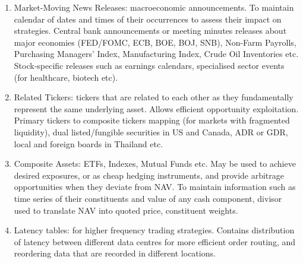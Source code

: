 \begin{definition}
\begin{enumerate}[label=\roman*.]
\item Market-Moving News Releases: macroeconomic announcements. To maintain calendar of dates and times of their occurrences to assess their impact on strategies. Central bank announcements or meeting minutes releases about major economies (FED/FOMC, ECB, BOE, BOJ, SNB), Non-Farm Payrolls, Purchasing Managers' Index, Manufacturing Index, Crude Oil Inventories etc.\\
Stock-specific releases such as earnings calendars, specialised sector events (for healthcare, biotech etc).
\item Related Tickers: tickers that are related to each other as they fundamentally represent the same underlying asset. Allows efficient opportunity exploitation. Primary tickers to composite tickers mapping (for markets with fragmented liquidity), dual listed/fungible securities in US and Canada, ADR or GDR, local and foreign boards in Thailand etc.
\item Composite Assets: ETFs, Indexes, Mutual Funds etc. May be used to achieve desired exposures, or as cheap hedging instruments, and provide arbitrage opportunities when they deviate from NAV. To maintain information such as time series of their constituents and value of any cash component, divisor used to translate NAV into quoted price, constituent weights.
\item Latency tables: for higher frequency trading strategies. Contains distribution of latency between different data centres for more efficient order routing, and reordering data that are recorded in different locations.
\end{enumerate}
\end{definition}

